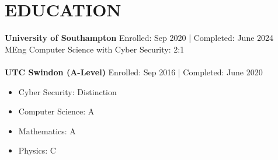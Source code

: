 \section*{EDUCATION}
\noindent
\textbf{University of Southampton} \hfill Enrolled: Sep 2020 | Completed: June 2024\\ %
MEng Computer Science with Cyber Security: 2:1\\
\\
\textbf{UTC Swindon (A-Level)} \hfill Enrolled: Sep 2016 | Completed: June 2020
\begin{itemize}
    \item Cyber Security: Distinction
    \item Computer Science: A
    \item Mathematics: A
    \item Physics: C
\end{itemize}

